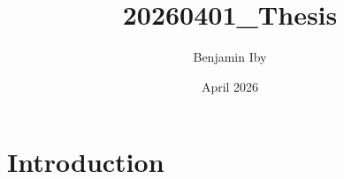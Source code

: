 \documentclass{article}
\title{20260401_Thesis}
\author{Benjamin Iby}
\date{April 2026}
\begin{document}
\maketitle

\section{Introduction}
\end{document}

